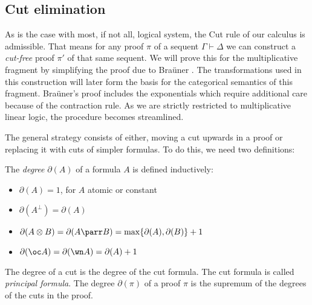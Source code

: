 \documentclass[DIN, pagenumber=false, fontsize=11pt, parskip=half, colorinlistoftodos, svgnames]{scrartcl}
\newcommand{\urgentnote}[2][]{\todo[color=red, #1]{#2}}
\begin{document}
	\subsection{Cut elimination }
	\label{cut-elimination}
	
	As is the case with most, if not all, logical system, the Cut rule of our calculus is admissible. 
	That means for any proof $\pi$ of a sequent $\Gamma \vdash \Delta $ we can construct a \emph{cut-free} proof $\pi'$ of that same sequent.  
	We will prove this for the multiplicative fragment by simplifying the proof due to Braüner \cite[Appendix B]{brauner}. 
	The transformations used in this construction will later form the basis for the categorical semantics of this fragment. 
	Braüner's proof includes the exponentials which require additional care because of the contraction rule. 
	As we are strictly restricted to multiplicative linear logic, the procedure becomes streamlined.
	
	The general strategy consists of either, moving a cut upwards in a proof or replacing it with cuts of simpler formulas. 
	To do this, we need two definitions:
	
	
	
	\begin{definition}[Degree]
		The \emph{degree} $\partial(A)$ of a formula $A$ is defined inductively:
		\begin{itemize}
			\item $\partial(A) = 1$, for $A$ atomic or constant
			\item $\partial \left(A^\bot\right) = \partial(A)$ 
			\item $\partial(A \otimes B) = \partial(A \parr B) = \max\{\partial(A), \partial(B)\} + 1$
			\item $\partial(\oc A ) = \partial(\wn A) = \partial(A) + 1$
		\end{itemize} 
		The degree of a cut is the degree of the cut formula. The cut formula is called \emph{principal formula}. The degree $\partial(\pi)$ of a proof $\pi$ is the supremum of the degrees of the cuts in the proof. 
	\end{definition}
	
\end{document}
